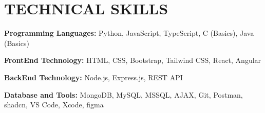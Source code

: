 \documentclass[letterpaper,11pt]{article}
\begin{document}





\noindent
\begin{minipage}[t]{0.48\textwidth}
    \section{\color{airforceblue}TECHNICAL SKILLS}
    \begin{itemize}[leftmargin=0in, label={}]
        \small{\item{
            \textbf{\normalsize{Programming Languages:}}{ \normalsize{Python, JavaScript, TypeScript, C (Basics), Java (Basics)}} \\
            \vspace{-12pt}
      
            \textbf{\normalsize{FrontEnd Technology:}}{ \normalsize{HTML, CSS, Bootstrap, Tailwind CSS,  React, Angular}} \\
            \vspace{-12pt}
      
            \textbf{\normalsize{BackEnd Technology:}}{ \normalsize{Node.js, Express.js, REST API}} \\
            \vspace{-12pt}
      
            \textbf{\normalsize{Database and Tools:}}{ \normalsize{MongoDB, MySQL, MSSQL, AJAX, Git, Postman, shadcn, VS Code, Xcode, figma}}
        }}
    \end{itemize}
\end{minipage}
\hfill
\vrule{} %
\hfill
\end{document}
